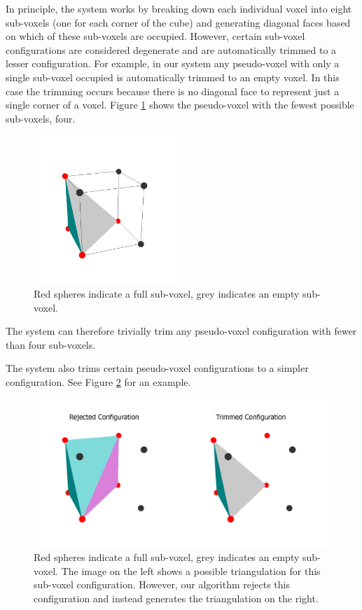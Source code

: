 In principle, the system works by breaking down each individual voxel into eight sub-voxels (one for each corner of the cube) and generating diagonal faces based on which of these sub-voxels are occupied.
However, certain sub-voxel configurations are considered degenerate and are automatically trimmed to a lesser configuration.
For example, in our system any pseudo-voxel with only a single sub-voxel occupied is automatically trimmed to an empty voxel.
In this case the trimming occurs because there is no diagonal face to represent just a single corner of a voxel.
Figure \ref{fig:minimumvoxel} shows the pseudo-voxel with the fewest possible sub-voxels, four.

\begin{figure}
	\centering
		\includegraphics[width=0.5\textwidth]{figures/minimumvoxel_edges.png}
	\caption{Red spheres indicate a full sub-voxel, grey indicates an empty sub-voxel.}
	\label{fig:minimumvoxel}
\end{figure}

The system can therefore trivially trim any pseudo-voxel configuration with fewer than four sub-voxels.

The system also trims certain pseudo-voxel configurations to a simpler configuration.
See Figure \ref{fig:voxelrejected} for an example.

\begin{figure}
	\centering
		\includegraphics[width=1.0\textwidth]{figures/voxelrejected.png}
	\caption{
		Red spheres indicate a full sub-voxel, grey indicates an empty sub-voxel.
		The image on the left shows a possible triangulation for this sub-voxel configuration.
		However, our algorithm rejects this configuration and instead generates the triangulation on the right.
	}
	\label{fig:voxelrejected}
\end{figure}

